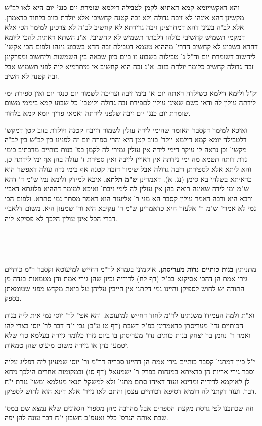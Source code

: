 \documentclass[12pt, openany]{book}
\newcommand{\sethebfont}{
\fontsize{10.5pt}{21.0pt} \selectfont
}
\newcommand{\twocol}[1]{
	{\sethebfont \begin{multicols}{2}
			#1
	\end{multicols}}	
}
\newcommand{\textblock}[1]{
{\sethebfont #1\\}	
}
\begin{document}
{\par והא דאקשי\textbf{יומא קמא דאתיא לקמן לטבילה דילמא שומרת יום כנג' יום היא}  לאו לב"ש מקשינן דהא אינהו לא זיבה גדולה ולא זבה קטנה קחשיבי אלא יולדת בזוב בלחוד כדאמרן. אלא לב"ה בעינן דהא דמחרצינן זיבה גרידתא לא קחשיב לב"ה לא צרכינן למימר הכי אלא דמקמי תשמיש קחשיבי כולהו דלבתר תשמיש לא קחשיבי. א"נ השתא דאתית להכי ליומא דחדא בשבוע לא קחשיב הדרי' מההוא טעמא דטבילת זבה חדא בשבוע נינהו ולפום הכי אקשי' ליחשוב דשומרת יום וה"ל ג' טבילות בשבוע זו ביום כיון שבאה בין השמשות וליחשוב ומפרקינן זבה גדולה קחשיב כלומר יולדת בזוב. א"נ זבה הוא קחשיב אי מיתרמיא ליה לפני תשמיש אבל זבה קטנה לא חשיב.\par  וק"ל ולימא דילמא כשילדה ראתה יום א' בימי זיבה וצריכה לשמור יום כנגד יום ואין ספירת ימי לידתה עולין לה ודאי כשם שאינן עולין לםפירת זבה גדולה וליטבי' כל שבוע קמא ביממי משום שומרת יום כנג' יום זיבה שלפני לידתה ואמאי פריך יומא קמא בלחוד.\par ואיכא למימר דקסבר האומר שהימי לידה עולין לשמור דזיבה קטנה ויולדת בזוב קטן דמקש' דלטבילה יומא קמא דילמא יולד' בזוב קטן היא והרי ספרה יום זה לפנינו בין לב"ש בין לב"ה מקשי' וכן נראה לי עיקר דימי לידה אין עולין גמירי לה לקמן בפ' בנות כותיים מדכתיב כימי נדת דותה תטמא מה ימי נידתה אין ראויין לזיבה ואין ספירת ז' עולה בהן אף ימי לידתה כן, והא ליתא אלא לספירתן דזבה גדולה אבל שימור דזבה קטנה אף בימי נדה עולה דאפשר הוא כדאיתא בשלהי בא סימן (נג, א). 
 דאמרינן \textbf{ש"מ תלתא.}  איכא למידק ולימא נמי ש"מ ד' דהא ש"מ ימי לידה שאינה רואה בהן אין עולין לה לימי זיבת' ואיכא למימר דההיא פלוגתא דאביי ורבא היא ורבה דאמר עולין קסבר הא מני ר' אליעזר הוא דאמר מסתר נמי סתרא. ולפום הכי נמי לא אמרי' ש"מ ר' אלעזר היא כדאמרינן ש"מ ר' עקיבא היא ור' שמעון היא. משום דלאביי דברי הכל אינן עולין הלכך לא פסיקא ליה. 
\par}
\textblock{}{}
\textblock{}{}
\twocol{מתניתין \textbf{בנות כותיים נדות מעריסתן.}  אוקמינן בגמרא לר"מ דחייש למיעוטא וקסבר ר"מ כותיים גירי אמת הן דהכי אסיקנא בב"ק (דף לח) לדידיה וכיון שהן גירי אמת והן מטמאות בנדה מן התורה יש לחוש לספיקן והיינו נמי דקתני אין חייבין עליהן על ביאת מקדש מפני שטומאתן בספק.\par וא"ת ולמה העמידו משנתינו לר"מ לחוד דחייש למיעוטא. והא אפי' לר' יוסי נמי אית ליה בנות הכותיים נדו' מעריסתן כדאמרינן בפ"ק דשבת (דף טז ע"ב) גבי י"ח דבר לר' יוסי בצרי להו ואמר ר' נחמן בר יצחק בנות כותים נדו' מעריסתן בו ביום גזרו כלומר גזירה בעלמא כדי שלא יטמעו בהן או גזירה משום מיעוט שהן טמאות.\par  י"ל כיון דמתני' קסבר כותיים גירי אמת הן דהיינו סבריה דר"מ ור' יוסי שמעינן ליה דפליג עליה וסבר גירי אריות הן כדאיתא במנחות בפרק ר' ישמעאל (דף סו) ובמקומות אחרים הילכך ניחא לן לאוקמא לדידיה ומדינא ועוד דאיהו סתם מתני' ולא למשקל תנאי מעלמא ומשו' גזרת י"ח דבר. ועוד דקתני לה דומיא דסיפא דכותיים עצמן והתם לאו נזיר' אלא דינא הוא לחוש לספיקן.\par  וזה שכתבנו לפי גרסת מקצת הספרים אבל מהרבה מהן מספרי הגאונים שלא נמצא שם במס' שבת אותה הגרס' כלל ואעפ"כ חשבון י"ח דבר עונה להן יפה. 
\par}
\end{document}
